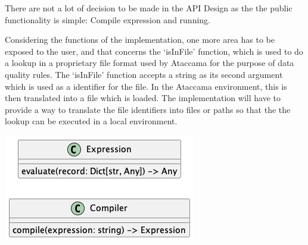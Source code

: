 There are not a lot of decision to be made in the API Design as the the public functionality is simple: Compile expression and running. 

Considering the functions of the implementation, one more area has to be exposed to the user, and that concerns the `isInFile' function, which is used to do a lookup in a proprietary file format used by Ataccama for the purpose of data quality rules. The `isInFile' function accepts a string as its second argument which is used as a identifier for the file. In the Ataccama environment, this is then translated into a file which is loaded. The implementation will have to provide a way to translate the file identifiers into files or paths so that the the lookup can be executed in a local environment.


\includegraphics{diagrams/api_design-class.png}